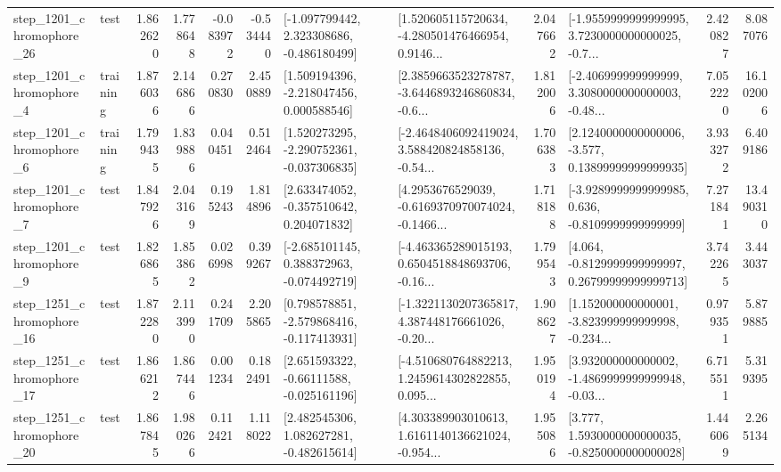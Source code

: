 \begin{tabular}{llrrrrllrlrr}
 step\_1201\_chromophore\_26 &      test &      1.862620 &    1.778648 &     -0.083972 & -0.534440 &   [-1.097799442, 2.323308686, -0.486180499] &  [1.520605115720634, -4.280501476466954, 0.9146... &       2.047662 &  [-1.9559999999999995, 3.7230000000000025, -0.7... &            2.420827 &          8.087076 \\
  step\_1201\_chromophore\_4 &  training &      1.876036 &    2.146866 &      0.270830 &  2.450889 &    [1.509194396, -2.218047456, 0.000588546] &  [2.3859663523278787, -3.6446893246860834, -0.6... &       1.812006 &  [-2.406999999999999, 3.3080000000000003, -0.48... &            7.052220 &         16.102006 \\
  step\_1201\_chromophore\_6 &  training &      1.799435 &    1.839886 &      0.040451 &  0.512464 &   [1.520273295, -2.290752361, -0.037306835] &  [-2.4648406092419024, 3.588420824858136, -0.54... &       1.706383 &  [2.1240000000000006, -3.577, 0.13899999999999935] &            3.933272 &          6.409186 \\
  step\_1201\_chromophore\_7 &      test &      1.847926 &    2.043169 &      0.195243 &  1.814896 &    [2.633474052, -0.357510642, 0.204071832] &  [4.2953676529039, -0.6169370970074024, -0.1466... &       1.718188 &  [-3.9289999999999985, 0.636, -0.8109999999999999] &            7.271841 &         13.490310 \\
  step\_1201\_chromophore\_9 &      test &      1.826865 &    1.853862 &      0.026998 &  0.399267 &   [-2.685101145, 0.388372963, -0.074492719] &  [-4.463365289015193, 0.6504518848693706, -0.16... &       1.799543 &  [4.064, -0.8129999999999997, 0.26799999999999713] &            3.742265 &          3.443037 \\
 step\_1251\_chromophore\_16 &      test &      1.872280 &    2.113990 &      0.241709 &  2.205865 &   [0.798578851, -2.579868416, -0.117413931] &  [-1.3221130207365817, 4.387448176661026, -0.20... &       1.908627 &  [1.152000000000001, -3.823999999999998, -0.234... &            0.979351 &          5.879885 \\
 step\_1251\_chromophore\_17 &      test &      1.866212 &    1.867446 &      0.001234 &  0.182491 &    [2.651593322, -0.66111588, -0.025161196] &  [-4.510680764882213, 1.2459614302822855, 0.095... &       1.950194 &  [3.932000000000002, -1.4869999999999948, -0.03... &            6.715511 &          5.319395 \\
 step\_1251\_chromophore\_20 &      test &      1.867845 &    1.980266 &      0.112421 &  1.118022 &    [2.482545306, 1.082627281, -0.482615614] &  [4.303389903010613, 1.6161140136621024, -0.954... &       1.955086 &   [3.777, 1.5930000000000035, -0.8250000000000028] &            1.446069 &          2.265134 \\

\end{tabular}
